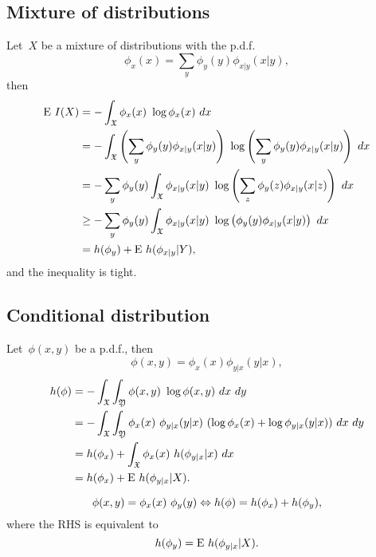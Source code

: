 \documentclass[10pt,a4paper]{article}
\theoremstyle{plain} \newtheorem{Lem}{Lemma}
\begin{document}
\subsection{Mixture of distributions}
Let~$X$ be a mixture of distributions with the p.d.f.
$$ \phi_x (x) = \sum_y \phi_y (y) \phi_{x|y}(x|y), $$
then
\begin{equation}
\begin{split}
  \mathrm E \  I(X) &= - \int_{\mathfrak X} \phi_x(x) \ \log \phi_x(x) \ d x \\
          &= - \int_{\mathfrak X} \left(\sum_y \phi_y (y) \phi_{x|y}(x|y) \right) \ \log \left(\sum_y \phi_y (y) \phi_{x|y}(x|y) \right) \ d x \\
          &= - \sum_y \phi_y (y) \int_{\mathfrak X} \phi_{x|y}(x|y) \ \log \left(\sum_z \phi_y (z) \phi_{x|y}(x|z) \right) \ d x \\
          &\ge - \sum_y \phi_y (y) \int_{\mathfrak X} \phi_{x|y}(x|y) \ \log \left(\phi_y (y) \phi_{x|y}(x|y) \right) \ d x \\
          &= h(\phi_y) + \mathrm E \  h(\phi_{x|y}|Y),
\end{split}
\end{equation}
and the inequality is tight.


\subsection{Conditional distribution}
Let~$\phi(x,y)$ be a p.d.f.,
then
$$ \phi(x,y) = \phi_x(x) \phi_{y|x}(y|x), $$
\begin{equation}
\begin{split}
h(\phi) &= -\int_{\mathfrak X} \int_{\mathfrak Y} \phi(x,y) \ \log \phi(x,y) \ dx \ dy \\
        &= -\int_{\mathfrak X} \int_{\mathfrak Y} \phi_x(x) \ \phi_{y|x}(y|x) \ (\log \phi_x(x) + \log \phi_{y|x}(y|x)) \ dx \ dy \\
        &= h(\phi_x) + \int_{\mathfrak X} \phi_x(x) \ h(\phi_{y|x}|x) \ dx \\
        &= h(\phi_x) + \E h(\phi_{y|x}|X).
\end{split}
\end{equation}

\begin{equation}
\phi(x,y) = \phi_x(x) \ \phi_y(y) \Leftrightarrow h(\phi) = h(\phi_x) + h(\phi_y),  \label{dep_h}
\end{equation}
where the RHS is equivalent to
$$ h(\phi_y) = \mathrm E \  h(\phi_{y|x}|X). $$
\end{document}
